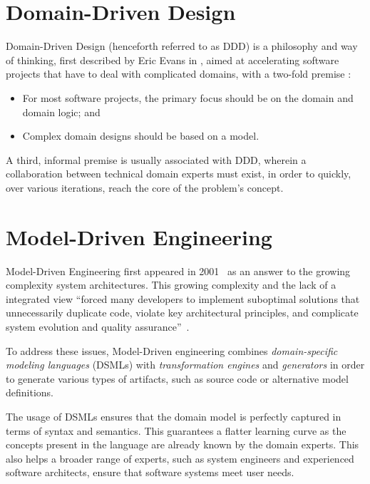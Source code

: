 \section{Domain-Driven Design}\label{sec:ddd}

Domain-Driven Design (henceforth referred to as DDD) is a philosophy and way of thinking, first described by Eric Evans in \cite{ddd_book}, aimed at accelerating software projects that have to deal with complicated domains,  with a two-fold premise \cite{ddd_website}:

\begin{itemize}
  \item For most software projects, the primary focus should be on the domain and domain logic; and
  \item Complex domain designs should be based on a model.
\end{itemize}

A third, informal premise is usually associated with DDD, wherein a collaboration between technical domain experts must exist, in order to quickly, over various iterations, reach the core of the problem's concept.

\section{Model-Driven Engineering}\label{sec:mda}

Model-Driven Engineering first appeared in 2001~\cite{Mil03} as an answer to the growing complexity system architectures. This growing complexity and the lack of a integrated view ``forced many developers to implement suboptimal solutions that unnecessarily duplicate code, violate key architectural principles, and complicate system evolution and quality assurance''~\cite{Sch06}.

To address these issues, Model-Driven engineering combines \emph{domain-specific modeling languages} (DSMLs) with \emph{transformation engines} and \emph{generators} in order to generate various types of artifacts, such as source code or alternative model definitions.

The usage of DSMLs ensures that the domain model is perfectly captured in terms of syntax and semantics. This guarantees a flatter learning curve as the concepts present in the language are already known by the domain experts. This also helps a broader range of experts, such as system engineers and experienced software architects, ensure that software systems meet user needs.

